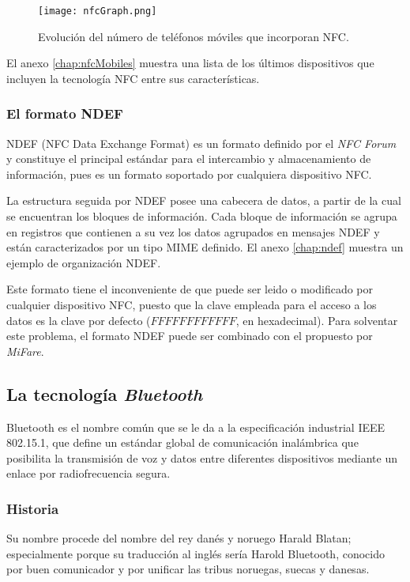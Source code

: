   \begin{figure}[!h]
    \begin{center}
      \texttt{[image: nfcGraph.png]}
      \caption{Evolución del número de teléfonos móviles que
      incorporan \acs{NFC}.}
      \label{fig:nfcGraph}
    \end{center}
  \end{figure}

El anexo \ref{chap:nfcMobiles} muestra una lista de los últimos dispositivos
que incluyen la tecnología \acs{NFC} entre sus características.

  \subsubsection{El formato \acs{NDEF}}
\acs{NDEF} (\acs{NFC} Data Exchange Format) es un formato definido por el
\emph{NFC Forum} y constituye el principal estándar para el intercambio y
almacenamiento de información, pues es un formato soportado por cualquiera 
dispositivo \acs{NFC}.

La estructura seguida por \acs{NDEF} posee una cabecera de datos, a partir de
la cual se encuentran los bloques de información. Cada bloque de información
se agrupa en registros que contienen a su vez los datos agrupados en mensajes
\acs{NDEF} y están caracterizados por un tipo \acs{MIME} definido. El
anexo \ref{chap:ndef} muestra un ejemplo de organización \acs{NDEF}.

Este formato tiene el inconveniente de que puede ser leido o modificado por
cualquier dispositivo \acs{NFC}, puesto que la clave empleada para el acceso
a los datos es la clave por defecto ($FF FF FF FF FF FF$, en hexadecimal).
Para solventar este problema, el formato \acs{NDEF} puede ser combinado con
el propuesto por \emph{MiFare}.

  \subsection{La tecnología \emph{Bluetooth}}
Bluetooth es el nombre común que se le da a la especificación industrial IEEE
802.15.1, que define un estándar global de comunicación inalámbrica que 
posibilita la transmisión de voz y datos entre diferentes dispositivos 
mediante un enlace por radiofrecuencia segura.

  \subsubsection{Historia}
Su nombre procede del nombre del rey danés y noruego Harald Blatan;
especialmente porque su traducción al inglés sería Harold Bluetooth, 
conocido por buen comunicador y por unificar las tribus noruegas, suecas y 
danesas.

